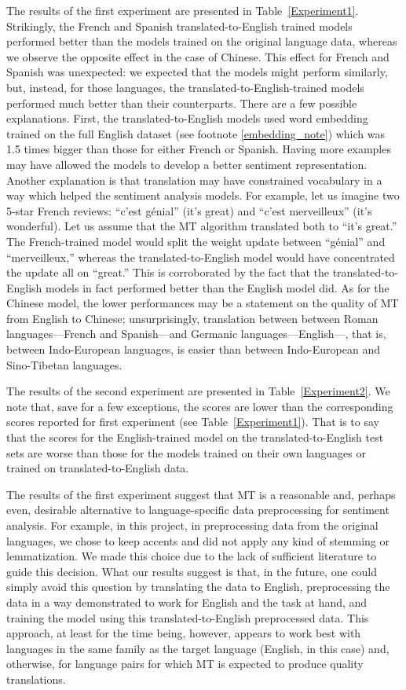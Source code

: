 \documentclass[11pt,a4paper]{article}
\begin{document}
    The results of the first experiment are presented in Table~\ref{Experiment1}. Strikingly, the French and Spanish translated-to-English trained models performed better than the models trained on the original language data, whereas we observe the opposite effect in the case of Chinese. This effect for French and Spanish was unexpected: we expected that the models might perform similarly, but, instead, for those languages, the translated-to-English-trained models performed much better than their counterparts. There are a few possible explanations. First, the translated-to-English models used word embedding trained on the full English dataset (see footnote \ref{embedding_note}) which was 1.5 times bigger than those for either French or Spanish. Having more examples may have allowed the models to develop a better sentiment representation. Another explanation is that translation may have constrained vocabulary in a way which helped the sentiment analysis models. For example, let us imagine two 5-star French reviews: ``c'est g\'enial'' (it's great) and ``c'est merveilleux'' (it's wonderful). Let us assume that the MT algorithm translated both to ``it's great.'' The French-trained model would split the weight update between ``g\'enial'' and ``merveilleux,'' whereas the translated-to-English model would have concentrated the update all on ``great.'' This is corroborated by the fact that the translated-to-English models in fact performed better than the English model did. As for the Chinese model, the lower performances may be a statement on the quality of MT from English to Chinese; unsurprisingly, translation between between Roman languages---French and Spanish---and Germanic languages---English---, that is, between Indo-European languages, is easier than between Indo-European and Sino-Tibetan languages.
    
    The results of the second experiment are presented in Table~\ref{Experiment2}. We note that, save for a few exceptions, the scores are lower than the corresponding scores reported for first experiment (see Table~\ref{Experiment1}). That is to say that the scores for the English-trained model on the translated-to-English test sets are worse than those for the models trained on their own languages or trained on translated-to-English data.
    
    The results of the first experiment suggest that MT is a reasonable and, perhaps even, desirable alternative to language-specific data preprocessing for sentiment analysis. For example, in this project, in preprocessing data from the original languages, we chose to keep accents and did not apply any kind of stemming or lemmatization. We made this choice due to the lack of sufficient literature to guide this decision. What our results suggest is that, in the future, one could simply avoid this question by translating the data to English, preprocessing the data in a way demonstrated to work for English and the task at hand, and training the model using this translated-to-English preprocessed data. This approach, at least for the time being, however, appears to work best with languages in the same family as the target language (English, in this case) and, otherwise, for language pairs for which MT is expected to produce quality translations.
    
\end{document}
